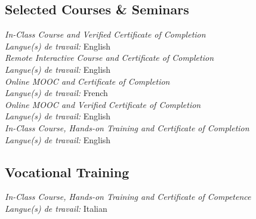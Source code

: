 \documentclass[
  a4paper, 
]{fortysecondscv}
\begin{document}
\subsection{Selected Courses \& Seminars}
\begin{cvtable}
		{{\small\emph{\small In-Class Course and Verified Certificate of Completion}\\\textit{\small Langue(s) de travail:} English}\\[-0.8em]}
		{{\small\emph{\small Remote Interactive Course and Certificate of Completion}\\\textit{\small Langue(s) de travail:} English}\\[-0.8em]}
		{{\small\emph{\small Online MOOC and Certificate of Completion}\\\textit{\small Langue(s) de travail:} French}\\[-0.8em]}
		{{\small\emph{\small Online MOOC and Verified Certificate of Completion}\\\textit{\small Langue(s) de travail:} English}\\[-0.8em]}
		{{\small\emph{\small In-Class Course, Hands-on Training and Certificate of Completion}\\\textit{\small Langue(s) de travail:} English}}
\end{cvtable}
\subsection{Vocational Training}
\begin{cvtable}
		{{\small\emph{\small In-Class Course, Hands-on Training and Certificate of Competence}\\\textit{\small Langue(s) de travail:} Italian}}
\end{cvtable}
\end{document}
